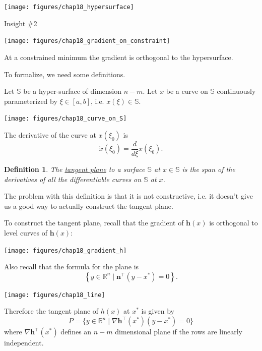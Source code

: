 \documentclass{article}
\newtheorem{definition}[theorem]{Definition}
\newcommand{\hbf}{\mathbf{h}}
\newcommand{\nbf}{\mathbf{n}}
\begin{document}
	\begin{center}
		\texttt{[image: figures/chap18\_hypersurface]}
	\end{center}
	
	{\color{blue}Insight  \#2}
	\begin{center}
		\texttt{[image: figures/chap18\_gradient\_on\_constraint]}
	\end{center}
	
	At a constrained minimum the gradient is orthogonal to the hypersurface.

	To formalize, we need some definitions.
	
	Let $\mathbb{S}$ be a hyper-surface of dimension $n-m$.  Let $x$ be a curve on $\mathbb{S}$ continuously parameterized by $\xi \in [a,b]$, i.e. $x(\xi) \in \mathbb{S}$.
	
	\begin{center}
		\texttt{[image: figures/chap18\_curve\_on\_S]}
	\end{center}
	
	The derivative of the curve at $x(\xi_0)$ is 
	\[
		\dot{x}(\xi_0) = \frac{d}{d\xi}x(\xi_0).
	\]	

	\begin{definition}
		The \underline{tangent plane} to a surface $\mathbb{S}$ at $x \in \mathbb{S}$ is the span of the derivatives of all the differentiable curves on $\mathbb{S}$ at $x$.
	\end{definition}
	
	\vfill

	The problem with this definition is that it is not constructive, i.e. it doesn't give us a good way to actually construct the tangent plane.
	
	To construct the tangent plane, recall that the gradient of $\hbf(x)$ is orthogonal to level curves of $\hbf(x)$:
	\begin{center}
		\texttt{[image: figures/chap18\_gradient\_h]}
	\end{center}	
	Also recall that the formula for the plane is
	\[
		\left\{ y\in \mathbb{R}^n \mid \nbf^\top (y-x^{\ast})=0 \right\}.
	\]
	\begin{center}
		\texttt{[image: figures/chap18\_line]}
	\end{center}

	Therefore the tangent plane of $h(x)$ at $x^{\ast}$ is given by
	\[ 
		P = \{ y\in \mathbb{R}^n \mid \nabla \hbf^\top (x^{\ast})(y-x^{\ast}) =0 \} 
	\]
	where $\nabla \hbf^\top (x^{\ast})$ defines an $n-m$ dimensional plane if the rows are linearly independent.
\end{document}
